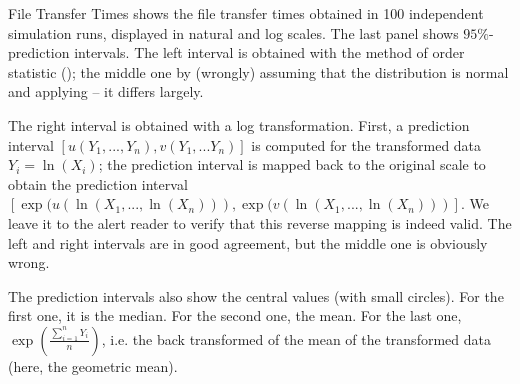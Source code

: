 \begin{ex}{File Transfer Times}
  shows the file
transfer times obtained in 100 independent simulation runs,
displayed in natural and log scales. The last panel shows
$95\%$-prediction intervals. The left interval is obtained with
the method of order statistic (); the
middle one by (wrongly) assuming that the distribution is
normal and applying  -- it differs largely.

The right interval is obtained with a log transformation.
First, a prediction interval $[u(Y_1,...,Y_n),v(Y_1,...Y_n)]$
is computed for the transformed data $Y_i=\ln(X_i)$; the
prediction interval is mapped back to the original scale to
obtain the prediction interval
$[\exp(u(\ln(X_1,...,\ln(X_n))),\exp(v(\ln(X_1,...,\ln(X_n)))]$.
We leave it to the alert reader to verify that this reverse
mapping is indeed valid. The left and right intervals are in
good agreement, but the middle one is obviously wrong.

The prediction intervals also show the central values (with
small circles). For the first one, it is the median. For the
second one, the mean. For the last one,
$\exp\left(\frac{\sum_{i=1}^nY_i}{n}\right)$, i.e. the back
transformed of the mean of the transformed data (here, the
geometric mean).
\begin{figure}
\center
%
\end{figure}
\end{ex}

